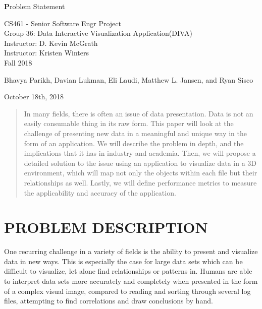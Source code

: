 \documentclass[journal,10pt,onecolumn,compsoc]{IEEEtran} \usepackage[margin=1.0in]{geometry} \usepackage{pdfpages}
\begin{document}
\begin{titlepage}
\begin{center}
  
  \textbf{}

  \vspace{4cm}
  \Huge{}
  \textbf Problem Statement
  \vspace{1.5cm}

 
  \LARGE
  CS461 - Senior Software Engr Project\\
  \vspace{0.25cm}
  Group 36: Data Interactive Visualization Application(DIVA)\\
  Instructor: D. Kevin McGrath \\
  Instructor: Kristen Winters \\
  \vspace{0.25cm}
  Fall 2018 \\
  \vspace{1.5cm}
  
  \large{Bhavya Parikh, Davian Lukman, Eli Laudi, Matthew L. Jansen, and Ryan Sisco}\\
  \date{October 18th, 2018}
  \vfill
  October 18th, 2018\\
  \vspace{1cm}
  \vspace*{\fill}
   \begin{abstract}
       \noindent In many fields, there is often an issue of data presentation. Data is not an easily consumable thing in its raw form. This paper will look at the challenge of presenting new data in a meaningful and unique way in the form of an application. We will describe the problem in depth, and the implications that it has in industry and academia. Then, we will propose a detailed solution to the issue using an application to visualize data in a 3D environment, which will map not only the objects within each file but their relationships as well. Lastly, we will define performance metrics to measure the applicability and accuracy of the application.
   \end{abstract}
   \normalsize 
  \end{center}
  \end{titlepage}
  
\section{PROBLEM DESCRIPTION}
    One recurring challenge in a variety of fields is the ability to present and visualize data in new ways. This is especially the case for large data sets which can be difficult to visualize, let alone find relationships or patterns in. Humans are able to interpret data sets more accurately and completely when presented in the form of a complex visual image, compared to reading and sorting through several log files, attempting to find correlations and draw conclusions by hand.
    
\end{document}

